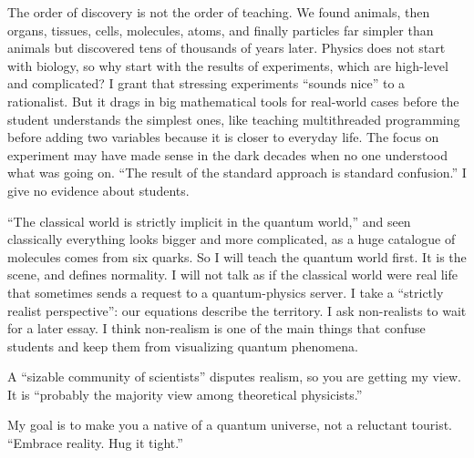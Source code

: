 The order of discovery is not the order of teaching. We found animals, then organs, tissues, cells, molecules, atoms, and finally particles far simpler than animals but discovered tens of thousands of years later. Physics does not start with biology, so why start with the results of experiments, which are high-level and complicated? I grant that stressing experiments ``sounds nice'' to a rationalist. But it drags in big mathematical tools for real-world cases before the student understands the simplest ones, like teaching multithreaded programming before adding two variables because it is closer to everyday life. The focus on experiment may have made sense in the dark decades when no one understood what was going on. ``The result of the standard approach is standard confusion.'' I give no evidence about students.

``The classical world is strictly implicit in the quantum world,'' and seen classically everything looks bigger and more complicated, as a huge catalogue of molecules comes from six quarks. So I will teach the quantum world first. It is the scene, and defines normality. I will not talk as if the classical world were real life that sometimes sends a request to a quantum-physics server.  I take a ``strictly realist perspective'': our equations describe the territory. I ask non-realists to wait for a later essay. I think non-realism is one of the main things that confuse students and keep them from visualizing quantum phenomena. 

A ``sizable community of scientists'' disputes realism, so you are getting my view. It is ``probably the majority view among theoretical physicists.'' 

My goal is to make you a native of a quantum universe, not a reluctant tourist. ``Embrace reality. Hug it tight.''
